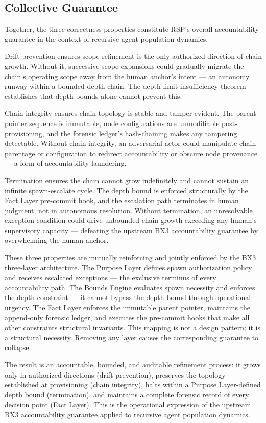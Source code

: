\subsection{Collective Guarantee}
\label{sec:rs-collective}

Together, the three correctness properties constitute RSP's overall accountability guarantee in the context of recursive agent population dynamics.

Drift prevention ensures scope refinement is the only authorized direction of chain growth. Without it, successive scope expansions could gradually migrate the chain's operating scope away from the human anchor's intent — an autonomy runway within a bounded-depth chain. The depth-limit insufficiency theorem establishes that depth bounds alone cannot prevent this.

Chain integrity ensures chain topology is stable and tamper-evident. The parent pointer sequence is immutable, node configurations are unmodifiable post-provisioning, and the forensic ledger's hash-chaining makes any tampering detectable. Without chain integrity, an adversarial actor could manipulate chain parentage or configuration to redirect accountability or obscure node provenance — a form of accountability laundering.

Termination ensures the chain cannot grow indefinitely and cannot sustain an infinite spawn-escalate cycle. The depth bound is enforced structurally by the Fact Layer pre-commit hook, and the escalation path terminates in human judgment, not in autonomous resolution. Without termination, an unresolvable exception condition could drive unbounded chain growth exceeding any human's supervisory capacity — defeating the upstream BX3 accountability guarantee by overwhelming the human anchor.

These three properties are mutually reinforcing and jointly enforced by the BX3 three-layer architecture. The Purpose Layer defines spawn authorization policy and receives escalated exceptions — the exclusive terminus of every accountability path. The Bounds Engine evaluates spawn necessity and enforces the depth constraint — it cannot bypass the depth bound through operational urgency. The Fact Layer enforces the immutable parent pointer, maintains the append-only forensic ledger, and executes the pre-commit hooks that make all other constraints structural invariants. This mapping is not a design pattern; it is a structural necessity. Removing any layer causes the corresponding guarantee to collapse.

The result is an accountable, bounded, and auditable refinement process: it grows only in authorized directions (drift prevention), preserves the topology established at provisioning (chain integrity), halts within a Purpose Layer-defined depth bound (termination), and maintains a complete forensic record of every decision point (Fact Layer). This is the operational expression of the upstream BX3 accountability guarantee applied to recursive agent population dynamics.